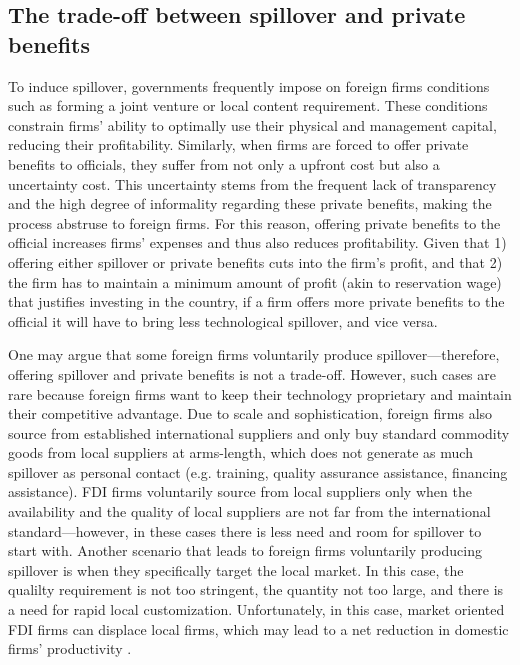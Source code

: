 \subsection{The trade-off between spillover and private benefits}
\label{sec:theory_tradeoff}

To induce spillover, governments frequently impose on foreign firms conditions such as forming a joint venture or local content requirement. These conditions constrain firms' ability to optimally use their physical and management capital, reducing their profitability. Similarly, when firms are forced to offer private benefits to officials, they suffer from not only a upfront cost but also a uncertainty cost. This uncertainty stems from the frequent lack of transparency and the high degree of informality regarding these private benefits, making the process abstruse to foreign firms. For this reason, offering private benefits to the official increases firms' expenses and thus also reduces profitability. Given that 1) offering either spillover or private benefits cuts into the firm's profit, and that 2) the firm has to maintain a minimum amount of profit (akin to reservation wage) that justifies investing in the country, if a firm offers more private benefits to the official it will have to bring less technological spillover, and vice versa.

One may argue that some foreign firms voluntarily produce spillover---therefore, offering spillover and private benefits is not a trade-off. However, such cases are rare because foreign firms want to keep their technology proprietary and maintain their competitive advantage. Due to scale and sophistication, foreign firms also source from established international suppliers and only buy standard commodity goods from local suppliers at arms-length, which does not generate as much spillover as personal contact (e.g. training, quality assurance assistance, financing assistance). FDI firms voluntarily source from local suppliers only when the availability and the quality of local suppliers are not far from the international standard---however, in these cases there is less need and room for spillover to start with. Another scenario that leads to foreign firms voluntarily producing spillover is when they specifically target the local market. In this case, the qualilty requirement is not too stringent, the quantity not too large, and there is a need for rapid local customization. Unfortunately, in this case, market oriented FDI firms can displace local firms, which may lead to a net reduction in domestic firms' productivity \citep{Mody2004}.


